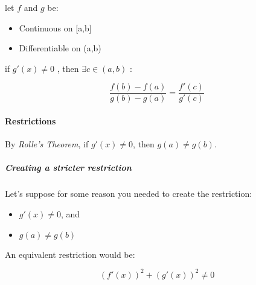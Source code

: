 \documentclass[
]{article}
\begin{document}
let \(f\) and \(g\) be:

\begin{itemize}
\item
  Continuous on {[}a,b{]}
\item
  Differentiable on (a,b)
\end{itemize}

if \(g'(x)  \neq 0\) , then \(\exists c \in (a,b)\) :

\[\frac{f\left( b \right)-f\left( a \right)}{g\left( b \right) - g\left( a \right)} = \frac{f'\left( c \right)}{g'\left( c \right)}\]

\hypertarget{header-n4054}{%
\paragraph{Restrictions}\label{header-n4054}}

By \emph{Rolle's Theorem}, if \(g'(x) \neq 0\), then \(g(a) \neq g(b)\).

\hypertarget{header-n4056}{%
\subparagraph{Creating a stricter restriction}\label{header-n4056}}

Let's suppose for some reason you needed to create the restriction:

\begin{itemize}
\item
  \(g'(x) \neq 0\), and
\item
  \(g(a) \neq g(b)\) 
\end{itemize}

An equivalent restriction would be:

\[\left( f'\left( x \right) \right)^{2} + \left( g'\left( x \right) \right)^{2} \neq 0\]
\end{document}
